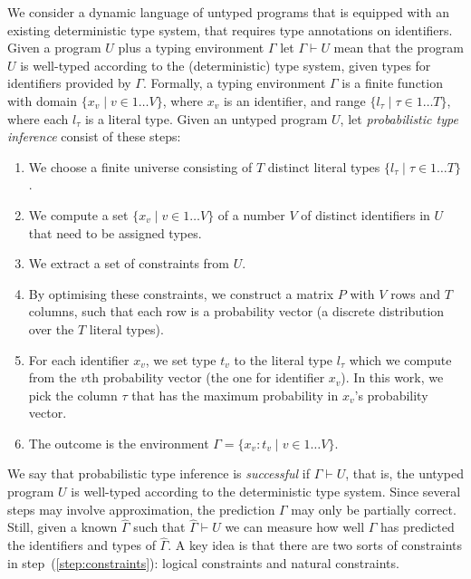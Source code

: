 \documentclass[acmsmall, review, anonymous]{acmart}\settopmatter{printfolios=true,printccs=false,printacmref=false}
\begin{document}
We consider a dynamic language of untyped programs that is equipped with an existing deterministic type system,
that requires type annotations on identifiers.
%
Given a program $U$ plus a typing environment $\Gamma$ let $\Gamma \vdash U$ mean that the program $U$ is well-typed according to the (deterministic) type system, given types for identifiers provided by $\Gamma$.
%
Formally, a typing environment $\Gamma$ is a finite function
with domain $\{ x_v \mid v \in 1 \ldots V\}$, where $x_v$  is an identifier, and range $\{ l_\tau \mid \tau \in 1 \dots T \}$, where each $l_\tau$ is a literal type.
Given an untyped program $U$,
let \emph{probabilistic type inference} consist of these steps:
\begin{enumerate}
	\item We choose a finite universe consisting of $T$ distinct literal types $\{ l_\tau \mid \tau \in 1 \dots T \}$.
	\item We compute a set $\{ x_v \mid v \in 1 \ldots V\}$ of a number $V$ of distinct identifiers in $U$ that need to be assigned types.
	\item \label{step:constraints} We extract a set of constraints from $U$.
	\item \label{step:optimise} By optimising these constraints, we construct a matrix $P$ with $V$ rows and $T$ columns,
	      such that each row is a probability vector
	      (a discrete distribution over the $T$ literal types).
	\item For each identifier $x_v$, we set type $t_v$ to the literal type $l_\tau$ which we compute from the $v$th probability vector (the one for identifier $x_v$).  In this work, we pick the column $\tau$ that has the maximum probability in $x_v$'s probability vector.
	\item The outcome is the environment $\Gamma = \{ x_v : t_v \mid v \in 1 \ldots V\}$.
\end{enumerate}

We say that probabilistic type inference is \emph{successful} if $\Gamma \vdash U$, that is, the untyped program $U$ is well-typed according to the deterministic type system.
%
Since several steps may involve approximation, the prediction $\Gamma$ may only be partially correct.
%
Still, given a known $\hat{\Gamma}$ such that $\hat{\Gamma} \vdash U$ we can measure how well $\Gamma$ has predicted the identifiers and types of $\hat{\Gamma}$.
%
A key idea is that there are two sorts of constraints in step~(\ref{step:constraints}): logical constraints and natural
constraints.
\end{document}
